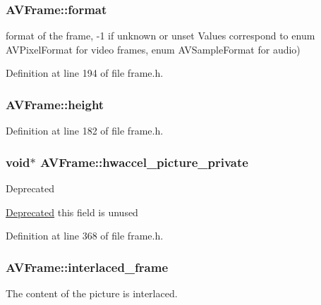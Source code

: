 \subsubsection[{\texorpdfstring{format}{format}}]{ A\+V\+Frame\+::format}\hypertarget{struct_a_v_frame_aed14fa772ce46881020fd1545c86432c}{}\label{struct_a_v_frame_aed14fa772ce46881020fd1545c86432c}
format of the frame, -\/1 if unknown or unset Values correspond to enum A\+V\+Pixel\+Format for video frames, enum A\+V\+Sample\+Format for audio) 

Definition at line 194 of file frame.\+h.

\subsubsection[{\texorpdfstring{height}{height}}]{ A\+V\+Frame\+::height}\hypertarget{struct_a_v_frame_a3f89733f429c98ba5bc64373fb0a3f13}{}\label{struct_a_v_frame_a3f89733f429c98ba5bc64373fb0a3f13}


Definition at line 182 of file frame.\+h.

\subsubsection[{\texorpdfstring{hwaccel\+\_\+picture\+\_\+private}{hwaccel_picture_private}}]{ {\bf void}$\ast$ A\+V\+Frame\+::hwaccel\+\_\+picture\+\_\+private}\hypertarget{struct_a_v_frame_a65f7f4bcff7f6ffb020138d839bbb3f6}{}\label{struct_a_v_frame_a65f7f4bcff7f6ffb020138d839bbb3f6}
\begin{DoxyRefDesc}{Deprecated}
\item[\hyperlink{deprecated__deprecated000026}{Deprecated}]this field is unused \end{DoxyRefDesc}


Definition at line 368 of file frame.\+h.

\subsubsection[{\texorpdfstring{interlaced\+\_\+frame}{interlaced_frame}}]{ A\+V\+Frame\+::interlaced\+\_\+frame}\hypertarget{struct_a_v_frame_a7f761518da738c704676c6a5f08eeb8e}{}\label{struct_a_v_frame_a7f761518da738c704676c6a5f08eeb8e}
The content of the picture is interlaced. 


